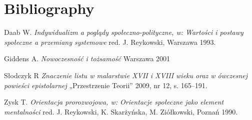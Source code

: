 \documentclass{article}
\begin{document}
\newpage
\section{Bibliography}

\begin{thebibliography}{}
\label{sec:bib1}
Daab W.
\textit{Indywidualizm a poglądy społeczno-polityczne, w: Wartości i postawy społeczne a przemiany
systemowe}
 red. J. Reykowski, Warszawa 1993. 
 
 \label{sec:bib2}
 Giddens A.
 \textit{Nowoczesność i tożsamość}
 Warszawa 2001
 
 \label{sec:bib3}
 Słodczyk R
 \textit{Znaczenie listu w malarstwie XVII i XVIII wieku oraz w ówczesnej powieści epistolarnej}
 „Przestrzenie Teorii” 2009, nr 12, s. 165–191.
 
 \label{sec:bib4}
 Zysk T.
 \textit{Orientacja prorozwojowa, w: Orientacje społeczne jako element mentalności}
 red. J. Reykowski,
K. Skarżyńska, M. Ziółkowski, Poznań 1990. 

\end{thebibliography}
\end{document}
